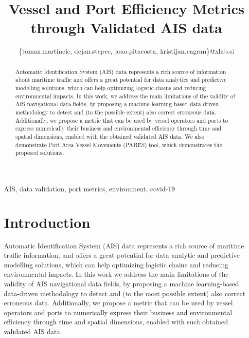 \documentclass[conference]{IEEEtran}
\begin{document}
\title{Vessel and Port Efficiency Metrics through Validated AIS data}

\author{
\{tomaz.martincic, dejan.stepec, joao.pitacosta, kristijan.cagran\}@xlab.si
}

\maketitle

\begin{abstract}
Automatic Identification System (AIS) data represents a rich source of information about maritime traffic and offers a great potential for data analytics and predictive modelling solutions, which can help optimizing logistic chains and reducing environmental impacts. In this work, we address the main limitations of the validity of AIS navigational data fields, by proposing a machine learning-based data-driven methodology to detect and (to the possible extent) also correct erroneous data. Additionally, we propose a metric that can be used by vessel operators and ports to express numerically their business and environmental efficiency through time and spatial dimensions, enabled with the obtained validated AIS data. We also demonstrate Port Area Vessel Movements (PARES) tool, which demonstrates the proposed solutions.
\end{abstract}

\begin{IEEEkeywords}
AIS, data validation, port metrics, environment, covid-19
\end{IEEEkeywords}

\section{Introduction}

Automatic Identification System (AIS) data represents a rich source of  maritime traffic information, and offers a great potential for data analytic and predictive modelling solutions, which can help optimizing logistic chains and reducing environmental impacts. In this work we address the main limitations of the validity of AIS navigational data fields, by proposing a machine learning-based data-driven methodology to detect and (to the most possible extent) also correct erroneous data. Additionally, we propose a metric that can be used by vessel operators and ports to numerically express their business and environmental efficiency through time and spatial dimensions, enabled with such obtained validated AIS data.
\end{document}
